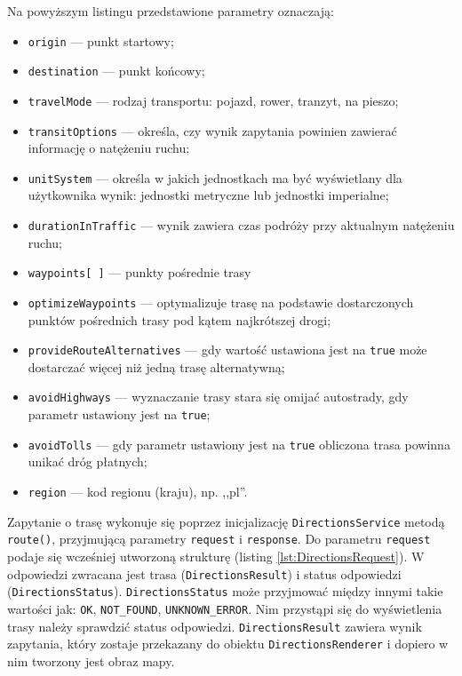 \documentclass[eng,printmode,oneside]{mgr}
\begin{document}
Na powyższym listingu przedstawione parametry oznaczają:
\begin{itemize}
  \item \texttt{origin} --- punkt startowy;
  \item \texttt{destination} --- punkt końcowy;
  \item \texttt{travelMode} --- rodzaj transportu: pojazd, rower, tranzyt, na
  pieszo;
  \item \texttt{transitOptions} --- określa, czy wynik zapytania powinien zawierać
  informację o natężeniu ruchu;
  \item \texttt{unitSystem} --- określa w jakich jednostkach ma być wyświetlany
  dla użytkownika wynik: jednostki metryczne lub jednostki imperialne;
  \item \texttt{durationInTraffic} --- wynik zawiera czas podróży przy aktualnym
  natężeniu ruchu;
  \item \texttt{waypoints[ ]} --- punkty pośrednie trasy
  \item \texttt{optimizeWaypoints} --- optymalizuje trasę na podstawie
  dostarczonych punktów pośrednich trasy pod kątem najkrótszej drogi;
  \item \texttt{provideRouteAlternatives} --- gdy wartość ustawiona jest na
  \texttt{true} może dostarczać więcej niż jedną trasę alternatywną;
  \item \texttt{avoidHighways} --- wyznaczanie trasy stara się omijać autostrady,
  gdy parametr ustawiony jest na \texttt{true};
  \item \texttt{avoidTolls} --- gdy parametr ustawiony jest na \texttt{true}
  obliczona trasa powinna unikać dróg płatnych;
  \item \texttt{region} --- kod regionu (kraju), np. ,,pl''.
\end{itemize}

Zapytanie o trasę wykonuje się poprzez inicjalizację \texttt{DirectionsService}
metodą \texttt{route()}, przyjmującą parametry \texttt{request} i
\texttt{response}.
Do parametru \texttt{request} podaje się wcześniej utworzoną strukturę (listing
\ref{lst:DirectionsRequest}). W odpowiedzi zwracana jest
trasa (\texttt{DirectionsResult}) i status odpowiedzi
(\texttt{DirectionsStatus}). \texttt{DirectionsStatus} może przyjmować między
innymi takie wartości jak: \texttt{OK}, \texttt{NOT\_FOUND},
\texttt{UNKNOWN\_ERROR}. Nim przystąpi się
do wyświetlenia trasy należy sprawdzić status odpowiedzi.
\texttt{DirectionsResult} zawiera wynik zapytania, który zostaje przekazany do obiektu \texttt{DirectionsRenderer} i dopiero w nim
tworzony jest obraz mapy.
\end{document}
